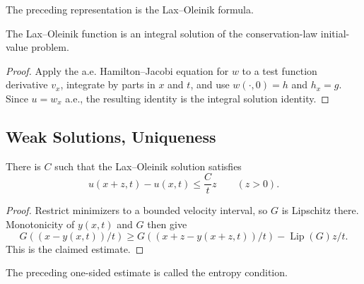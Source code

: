 \begin{definition}
\label{def:lax-oleinik-formula}
The preceding representation is the Lax--Oleinik formula.
\end{definition}

\begin{theorem}
\label{thm:lax-oleinik-integral-solution}
The Lax--Oleinik function is an integral solution of the conservation-law
initial-value problem.
\end{theorem}

\begin{proof}
\sketch Apply the a.e. Hamilton--Jacobi equation for $w$ to a test function
derivative $v_x$, integrate by parts in $x$ and $t$, and use $w(\cdot,0)=h$
and $h_x=g$. Since $u=w_x$ a.e., the resulting identity is the integral
solution identity.
\end{proof}

\subsection{Weak Solutions, Uniqueness}
\label{sec:conservation-laws-entropy-uniqueness}

\begin{lemma}
\label{lem:lax-oleinik-entropy-estimate}
There is $C$ such that the Lax--Oleinik solution satisfies
\[
u(x+z,t)-u(x,t)\le\frac Ct z\qquad(z>0).
\]
\end{lemma}

\begin{proof}
\sketch Restrict minimizers to a bounded velocity interval, so $G$ is
Lipschitz there. Monotonicity of $y(x,t)$ and $G$ then give
\[
G((x-y(x,t))/t)\ge G((x+z-y(x+z,t))/t)-\operatorname{Lip}(G)z/t.
\]
This is the claimed estimate.
\end{proof}

\begin{definition}
\label{def:entropy-condition-inequality}
The preceding one-sided estimate is called the entropy condition.
\end{definition}

